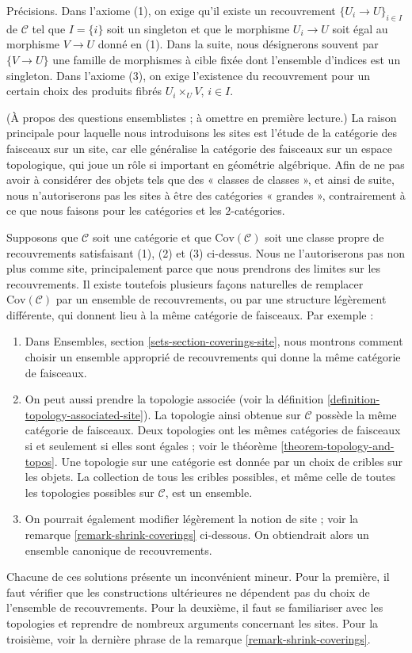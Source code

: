 \noindent
Précisions. Dans l’axiome (1), on exige qu’il existe un recouvrement
$\{U_i \to U\}_{i \in I}$ de $\mathcal{C}$ tel que $I = \{i\}$ soit un
singleton et que le morphisme $U_i \to U$ soit égal au morphisme
$V \to U$ donné en (1). Dans la suite, nous désignerons souvent par
$\{V \to U\}$ une famille de morphismes à cible fixée dont l’ensemble
d’indices est un singleton. Dans l’axiome (3), on exige l’existence du
recouvrement pour un certain choix des produits fibrés
$U_i \times_U V$, $i \in I$.

\begin{remark}
\label{remark-no-big-sites}
(À propos des questions ensemblistes ; à omettre en première lecture.)
La raison principale pour laquelle nous introduisons les sites est l’étude
de la catégorie des faisceaux sur un site, car elle généralise la catégorie
des faisceaux sur un espace topologique, qui joue un rôle si important en
géométrie algébrique. Afin de ne pas avoir à considérer des objets tels que
des « classes de classes », et ainsi de suite, nous n’autoriserons pas les
sites à être des catégories « grandes », contrairement à ce que nous faisons
pour les catégories et les $2$-catégories.

\medskip\noindent
Supposons que $\mathcal{C}$ soit une catégorie et que
$\text{Cov}(\mathcal{C})$ soit une classe propre de recouvrements
satisfaisant (1), (2) et (3) ci-dessus. Nous ne l’autoriserons pas non plus
comme site, principalement parce que nous prendrons des limites sur les
recouvrements. Il existe toutefois plusieurs façons naturelles de remplacer
$\text{Cov}(\mathcal{C})$ par un ensemble de recouvrements, ou par une
structure légèrement différente, qui donnent lieu à la même catégorie de
faisceaux. Par exemple :
\begin{enumerate}
\item Dans Ensembles, section \ref{sets-section-coverings-site}, nous montrons
comment choisir un ensemble approprié de recouvrements qui donne la même
catégorie de faisceaux.
\item On peut aussi prendre la topologie associée (voir la
définition \ref{definition-topology-associated-site}). La topologie ainsi
obtenue sur $\mathcal{C}$ possède la même catégorie de faisceaux. Deux
topologies ont les mêmes catégories de faisceaux si et seulement si elles
sont égales ; voir le théorème \ref{theorem-topology-and-topos}. Une topologie
sur une catégorie est donnée par un choix de cribles sur les objets. La
collection de tous les cribles possibles, et même celle de toutes les
topologies possibles sur $\mathcal{C}$, est un ensemble.
\item On pourrait également modifier légèrement la notion de site ; voir la
remarque \ref{remark-shrink-coverings} ci-dessous. On obtiendrait alors un
ensemble canonique de recouvrements.
\end{enumerate}
Chacune de ces solutions présente un inconvénient mineur. Pour la première,
il faut vérifier que les constructions ultérieures ne dépendent pas du choix
de l’ensemble de recouvrements. Pour la deuxième, il faut se familiariser avec
les topologies et reprendre de nombreux arguments concernant les sites. Pour
la troisième, voir la dernière phrase de la
remarque \ref{remark-shrink-coverings}.


\end{remark}
